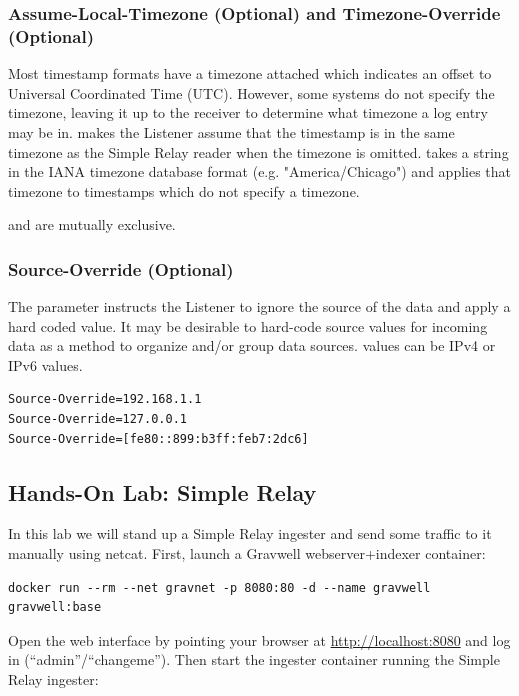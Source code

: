 \subsubsection{Assume-Local-Timezone (Optional) and Timezone-Override (Optional)}

Most timestamp formats have a timezone attached which indicates an
offset to Universal Coordinated Time (UTC). However, some systems do not
specify the timezone, leaving it up to the receiver to determine what
timezone a log entry may be in.  makes the
Listener assume that the timestamp is in the same timezone as the Simple
Relay reader when the timezone is omitted.  takes a
string in the IANA timezone database format (e.g. "America/Chicago") and
applies that timezone to timestamps which do not specify a timezone.

 and  are mutually
exclusive.

\subsubsection*{Source-Override (Optional)}

The  parameter instructs the Listener to ignore the
source of the data and apply a hard coded value. It may be desirable to
hard-code source values for incoming data as a method to organize and/or
group data sources.  values can be IPv4 or IPv6
values.

\begin{Verbatim}[breaklines=true]
Source-Override=192.168.1.1
Source-Override=127.0.0.1
Source-Override=[fe80::899:b3ff:feb7:2dc6]
\end{Verbatim}

\subsection{Hands-On Lab: Simple Relay}

In this lab we will stand up a Simple Relay ingester and send some
traffic to it manually using netcat. First, launch a Gravwell
webserver+indexer container:

\begin{Verbatim}[breaklines=true]
docker run --rm --net gravnet -p 8080:80 -d --name gravwell gravwell:base
\end{Verbatim}

Open the web interface by pointing your browser at \href{http://localhost:8080/}{http://localhost:8080} and log in (``admin''/``changeme''). Then start the ingester container running the Simple Relay ingester:

